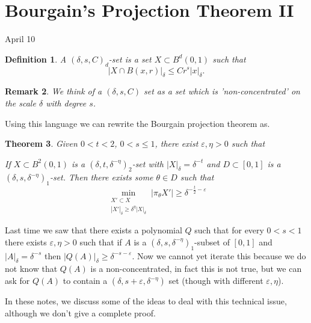 \documentclass[12pt]{amsart}
\newtheorem{theorem}{Theorem}[section]
\newtheorem{remark}[theorem]{Remark}
\newtheorem{Definition}[theorem]{Definition}
\begin{document}
\section{Bourgain's Projection Theorem II}

April 10

\begin{Definition}
    A $(\delta, s, C)_d$-set is a set $X \subset B^d(0,1)$ such that 
    $$|X \cap B(x,r)|_\delta \leq C r^s 
    |x|_\delta.$$
\end{Definition}
\begin{remark}
    We think of a $(\delta,s,C)$ set as a set which is 'non-concentrated' on the scale $\delta$ with degree $s$.
\end{remark}
Using this language we can rewrite the Bourgain projection theorem as.
\begin{theorem}
    Given $0 < t < 2$, $0 < s \leq 1$, there exist $\varepsilon, \eta > 0$ such that
    
    If $X \subset B^2 (0,1)$ is a $(\delta, t, \delta^{-\eta})_2$-set with $|X|_\delta = \delta^{-t}$ and $D \subset [0,1]$ is a $(\delta, s, \delta^{-\eta})_1$-set. Then there exists some $\theta \in D$ such that
    $$
        \min_{\substack{X' \subset X\\ |X'|_\delta \geq \delta^\eta |X|_\delta}} |\pi_\theta X'| \geq \delta^{-\frac{t}{2} - \varepsilon}
    $$
\end{theorem}
Last time we saw that there exists a polynomial $Q$ such that for every $0 < s < 1$ there exists $\varepsilon, \eta > 0$ such that if $A$ is a $(\delta, s, \delta^{-\eta})_1$-subset of $[0,1]$ and $|A|_\delta = \delta^{-s}$ then $|Q(A)|_\delta \geq \delta^{-s-\varepsilon}$. Now we cannot yet iterate this because we do not know that $Q(A)$ is a non-concentrated, in fact this is not true, but we can ask for $Q(A)$ to contain a $(\delta, s + \varepsilon, \delta^{-\eta})$ set (though with different $\varepsilon, \eta$).

In these notes,  we discuss some of the ideas to deal with this technical issue,  although we don't give a complete proof.
\end{document}
